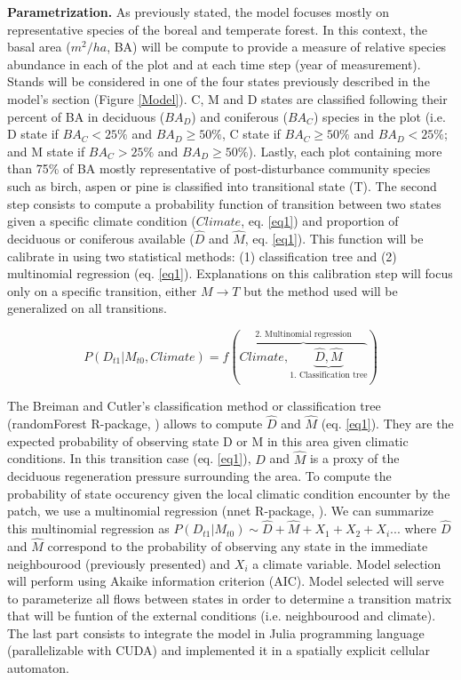 \textbf{Parametrization.} As previously stated, the model focuses mostly on
representative species of the boreal and temperate forest. In this context,
the basal area ($m^2/ha$, BA) will be compute to provide a measure of relative
species abundance in each of the plot and at each time step (year of
measurement). Stands will be considered in one of the four states previously
described in the model's section (Figure \ref{Model}). C, M and D states are
classified following their percent of BA in deciduous ($BA_D$) and coniferous
($BA_C$) species in the plot (i.e. D state if $BA_C < 25\%$ and $BA_D \geq
50\%$, C state if ${BA}_C \geq 50\%$ and $BA_D < 25\%$; and M state if $BA_C >
25\%$ and $BA_D \geq 50\%$). Lastly, each plot containing more than 75\% of BA
mostly representative of post-disturbance community species such as birch,
aspen or pine is classified into transitional state (T). The second step
consists to compute a probability function of transition between two states
given a specific climate condition ($Climate$, eq. \ref{eq1}) and proportion
of deciduous or coniferous available ($\hat{D}$ and $\hat{M}$, eq.
\ref{eq1}). This function will be calibrate in using two statistical methods:
(1) classification tree and (2) multinomial regression (eq. \ref{eq1}).
Explanations on this calibration step will focus only on a specific
transition, either $M \rightarrow T$ but the method used will be generalized
on all transitions.

\begin{equation}
	P(D_{t1}|M_{t0}, Climate) = f(\overbrace{Climate, \underbrace{\hat{D}, \hat{M}}_\text{1. Classification tree}}^\text{2. Multinomial regression})
\label{eq1}
\end{equation}

The Breiman and Cutler's classification method or classification tree
(randomForest R-package, \cite{Liaw2002a}) allows to compute $\hat{D}$ and
$\hat{M}$ (eq. \ref{eq1}). They are the expected probability of observing
state D or M in this area given climatic conditions. In this transition case
(eq. \ref{eq1}), $\hat{D}$ and $\hat{M}$ is a proxy of the deciduous
regeneration pressure surrounding the area. To compute the probability of
state occurency given the local climatic condition encounter by the patch, we
use a multinomial regression (nnet R-package, \cite{Venables2002}). We can
summarize this multinomial regression as $P(D_{t1}|M_{t0}) \sim \hat{D} +
\hat{M} + X_1+X_2+X_i... $ where $\hat{D}$ and $\hat{M}$ correspond to the
probability of observing any state in the immediate neighbourood (previously
presented) and $X_i$ a climate variable. Model selection will perform using
Akaike information criterion (AIC). Model selected will serve to parameterize
all flows between states in order to determine a transition matrix that will
be funtion of the external conditions (i.e. neighbourood and climate). The
last part consists to integrate the model in Julia programming language
(parallelizable with CUDA) and implemented it in a spatially explicit cellular
automaton.\\

